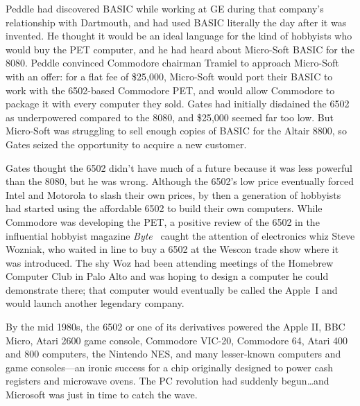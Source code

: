 

Peddle had discovered BASIC while working at GE during that company's
relationship with Dartmouth, and had used BASIC literally the day after
it was invented.  He thought it would be an ideal language for the kind
of hobbyists who would buy the PET computer, and he had heard about Micro-Soft
BASIC for the 8080.
Peddle convinced Commodore chairman Tramiel to approach Micro-Soft with
an offer: for a flat fee of \$25,000,
Micro-Soft would port their BASIC to work with the 6502-based Commodore
PET, and would 
allow Commodore to package it with every computer they sold.
Gates had initially disdained the 6502 as underpowered compared to the
8080, and \$25,000 seemed far too low.  But Micro-Soft was struggling to
sell enough copies of BASIC for the Altair 8800, so Gates
seized the opportunity to acquire a new customer.

Gates thought the 6502 didn't have much of a future because it was less
powerful than the 8080, but he was wrong.
Although the 6502's low price eventually forced Intel and Motorola to slash
their own prices, by then a generation of
hobbyists had started using the affordable 6502 to build their own computers.
While Commodore was developing the PET, a positive review of the 6502 in
the influential hobbyist magazine \emph{Byte}~\cite{byte75:6502} caught
the attention of electronics whiz Steve Wozniak, who waited in line to
buy a 6502 at the 
Wescon trade show where it was introduced.
The shy Woz had been attending meetings of the Homebrew Computer Club in
Palo Alto and was hoping to design a computer he could demonstrate
there; that computer would eventually be called the Apple~I and would
launch another legendary company.

By the mid 1980s, the 6502 or one of its derivatives powered the Apple
II, BBC Micro, Atari 2600 game console, Commodore VIC-20, Commodore 64,
Atari 400 and 800 computers, the Nintendo NES, and many lesser-known
computers and game consoles---an ironic success for a chip
originally designed to power cash registers and microwave ovens.
The PC revolution had suddenly begun\ldots{}and Microsoft was just in time
to catch the wave.

